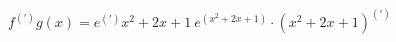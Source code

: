 \documentclass[preview]{standalone}
\begin{document}
\begin{align*}
f^(')g(x) = e^(') x^2+2x+1 \ e^(x^2+2x+1) \cdot (x^2+2x+1)^(')
\end{align*}
\end{document}
